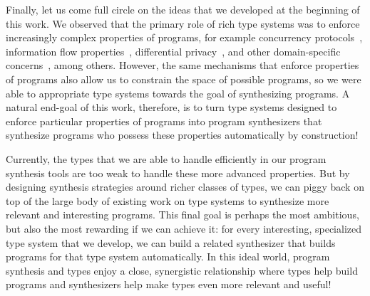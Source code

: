 Finally, let us come full circle on the ideas that we developed at the beginning of this work.
We observed that the primary role of rich type systems was to enforce increasingly complex properties of programs, for example concurrency protocols~\citep{mazurak-icfp-2010}, information flow properties~\citep{jia-icfp-2008}, differential privacy~\citep{gaboardi-popl-2013}, and other domain-specific concerns~\citep{hudak-handbook-pl-1998}, among others.
However, the same mechanisms that enforce properties of programs also allow us to constrain the space of possible programs, so we were able to appropriate type systems towards the goal of synthesizing programs.
A natural end-goal of this work, therefore, is to turn type systems designed to enforce particular properties of programs into program synthesizers that synthesize programs who possess these properties automatically by construction!

Currently, the types that we are able to handle efficiently in our program synthesis tools are too weak to handle these more advanced properties.
But by designing synthesis strategies around richer classes of types, we can piggy back on top of the large body of existing work on type systems to synthesize more relevant and interesting programs.
This final goal is perhaps the most ambitious, but also the most rewarding if we can achieve it: for every interesting, specialized type system that we develop, we can build a related synthesizer that builds programs for that type system automatically.
In this ideal world, program synthesis and types enjoy a close, synergistic relationship where types help build programs and synthesizers help make types even more relevant and useful!
